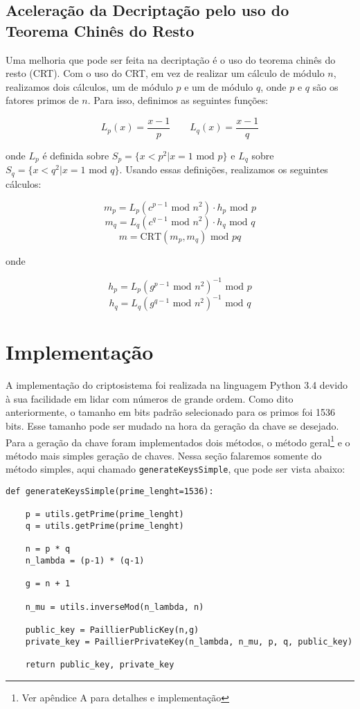 \documentclass[10pt]{article}
\begin{document}
        \subsection{Aceleração da Decriptação pelo uso do Teorema Chinês do Resto}
            Uma melhoria que pode ser feita na decriptação é o uso do teorema chinês do resto (CRT). Com o uso do CRT, em vez de realizar um cálculo de módulo $n$, realizamos dois cálculos, um de módulo $p$ e um de módulo $q$, onde $p$ e $q$ são os fatores primos de $n$. Para isso, definimos as seguintes funções:

            \[
            L_p(x) = \frac{x - 1}{p} \qquad L_q(x) = \frac{x - 1}{q}
            \]

            onde $L_p$ é definida sobre $S_p = \{x < p^2 | x = 1 \text{ mod } p\}$ e $L_q$ sobre $S_q = \{x < q^2 | x = 1 \text{ mod } q\}$. Usando essas definições, realizamos os seguintes cálculos:

            \[m_p = L_p(c^{p-1} \text{ mod } n^2) \cdot h_p \text{ mod } p \]
            \[m_q = L_q(c^{q-1} \text{ mod } n^2) \cdot h_q \text{ mod } q \]
            \[m   = \text{CRT}(m_p, m_q) \text{ mod } pq\]

            onde

            \[ h_p = L_p(g^{p-1} \text{ mod } n^2)^{-1} \text{ mod } p \]
            \[ h_q = L_q(g^{q-1} \text{ mod } n^2)^{-1} \text{ mod } q \]

    \section{Implementação}
        A implementação do criptosistema foi realizada na linguagem Python 3.4 devido à sua facilidade em lidar com números de grande ordem. Como dito anteriormente, o tamanho em bits padrão selecionado para os primos foi 1536 bits. Esse tamanho pode ser mudado na hora da geração da chave se desejado. Para a geração da chave foram implementados dois métodos, o método geral\footnote{Ver apêndice A para detalhes e implementação} e o método mais simples geração de chaves. Nessa seção falaremos somente do método simples, aqui chamado \texttt{generateKeysSimple}, que pode ser vista abaixo:

        \begin{verbatim}
def generateKeysSimple(prime_lenght=1536):

    p = utils.getPrime(prime_lenght)
    q = utils.getPrime(prime_lenght)

    n = p * q
    n_lambda = (p-1) * (q-1)

    g = n + 1

    n_mu = utils.inverseMod(n_lambda, n)

    public_key = PaillierPublicKey(n,g)
    private_key = PaillierPrivateKey(n_lambda, n_mu, p, q, public_key)

    return public_key, private_key              
        \end{verbatim}
\end{document}
